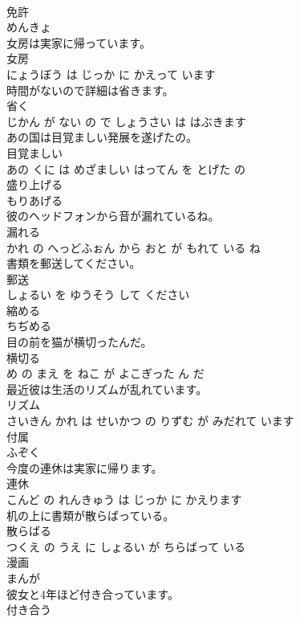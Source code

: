 \documentclass[8pt]{extreport}
\begin{document}
\begin{CJK}{UTF8}{min}
\\	免許	
\\	めんきょ			
\\	女房は実家に帰っています。	
\\	女房 
\\	にょうぼう は じっか に かえって います			
\\	時間がないので詳細は省きます。	
\\	省く 
\\	じかん が ない の で しょうさい は はぶきます			
\\	あの国は目覚ましい発展を遂げたの。	
\\	目覚ましい 
\\	あの くに は めざましい はってん を とげた の			
\\	盛り上げる	
\\	もりあげる			
\\	彼のヘッドフォンから音が漏れているね。	
\\	漏れる 
\\	かれ の へっどふぉん から おと が もれて いる ね			
\\	書類を郵送してください。	
\\	郵送 
\\	しょるい を ゆうそう して ください			
\\	縮める	
\\	ちぢめる			
\\	目の前を猫が横切ったんだ。	
\\	横切る 
\\	め の まえ を ねこ が よこぎった ん だ			
\\	最近彼は生活のリズムが乱れています。	
\\	リズム 
\\	さいきん かれ は せいかつ の りずむ が みだれて います			
\\	付属	
\\	ふぞく			
\\	今度の連休は実家に帰ります。	
\\	連休 
\\	こんど の れんきゅう は じっか に かえります			
\\	机の上に書類が散らばっている。	
\\	散らばる 
\\	つくえ の うえ に しょるい が ちらばって いる			
\\	漫画	
\\	まんが			
\\	彼女と4年ほど付き合っています。	
\\	付き合う 

\end{CJK}
\end{document}
